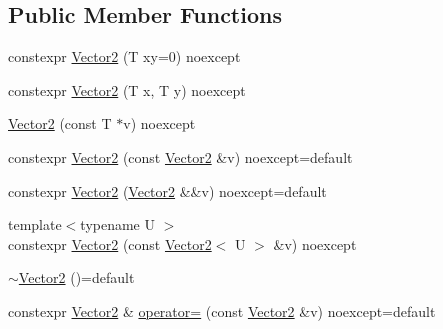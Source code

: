 \subsection*{Public Member Functions}
\begin{DoxyCompactItemize}
\item 
constexpr \hyperlink{structmage_1_1_vector2_3_01_t_00_01typename_01std_1_1enable__if__t_3_01std_1_1is__arithmetic__v_3_01_t_01_4_00_01void_01_4_01_4_a01066e022db38c416fcf0533af9d3b0a}{Vector2} (T xy=0) noexcept
\item 
constexpr \hyperlink{structmage_1_1_vector2_3_01_t_00_01typename_01std_1_1enable__if__t_3_01std_1_1is__arithmetic__v_3_01_t_01_4_00_01void_01_4_01_4_a5494e67ff10793410747d51aef3bf5e0}{Vector2} (T x, T y) noexcept
\item 
\hyperlink{structmage_1_1_vector2_3_01_t_00_01typename_01std_1_1enable__if__t_3_01std_1_1is__arithmetic__v_3_01_t_01_4_00_01void_01_4_01_4_a57dfdee698c1846041c9867a211520ff}{Vector2} (const T $\ast$v) noexcept
\item 
constexpr \hyperlink{structmage_1_1_vector2_3_01_t_00_01typename_01std_1_1enable__if__t_3_01std_1_1is__arithmetic__v_3_01_t_01_4_00_01void_01_4_01_4_acbbb0bc1d9b3d618df71113d0a3da4a2}{Vector2} (const \hyperlink{structmage_1_1_vector2}{Vector2} \&v) noexcept=default
\item 
constexpr \hyperlink{structmage_1_1_vector2_3_01_t_00_01typename_01std_1_1enable__if__t_3_01std_1_1is__arithmetic__v_3_01_t_01_4_00_01void_01_4_01_4_a02675bf87e8199b9e271aa0665b4a2a3}{Vector2} (\hyperlink{structmage_1_1_vector2}{Vector2} \&\&v) noexcept=default
\item 
{\footnotesize template$<$typename U $>$ }\\constexpr \hyperlink{structmage_1_1_vector2_3_01_t_00_01typename_01std_1_1enable__if__t_3_01std_1_1is__arithmetic__v_3_01_t_01_4_00_01void_01_4_01_4_ac0d6d975a967b3fbca3bacb8d37fbab4}{Vector2} (const \hyperlink{structmage_1_1_vector2}{Vector2}$<$ U $>$ \&v) noexcept
\item 
\hyperlink{structmage_1_1_vector2_3_01_t_00_01typename_01std_1_1enable__if__t_3_01std_1_1is__arithmetic__v_3_01_t_01_4_00_01void_01_4_01_4_a3d91f98495c29d6fc8d68ce1a72c7ee8}{$\sim$\+Vector2} ()=default
\item 
constexpr \hyperlink{structmage_1_1_vector2}{Vector2} \& \hyperlink{structmage_1_1_vector2_3_01_t_00_01typename_01std_1_1enable__if__t_3_01std_1_1is__arithmetic__v_3_01_t_01_4_00_01void_01_4_01_4_a2de8da8b895d5efd29fe92ec6f51a29f}{operator=} (const \hyperlink{structmage_1_1_vector2}{Vector2} \&v) noexcept=default

\end{DoxyCompactItemize}
